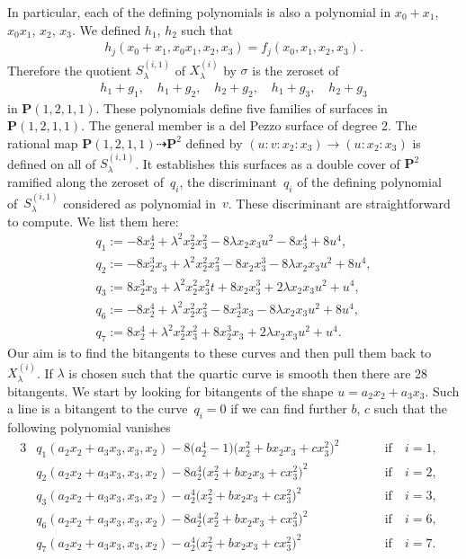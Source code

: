 \documentclass[pdftex]{sigma}
\numberwithin{equation}{section}
\begin{document}
In particular, each of the def\/ining polynomials is also a polynomial in $x_0+x_1$, $x_0x_1$, $x_2$, $x_3$. We def\/ined $h_1$, $h_2$ such that \begin{gather*}h_j(x_0+x_1,x_0x_1,x_2,x_3)=f_j(x_0,x_1,x_2,x_3).\end{gather*} Therefore the quotient $S^{(i,1)}_{\lambda}$ of $X^{(i)}_{\lambda}$ by $\sigma$ is the zeroset of
\begin{gather*} h_1+g_1,\quad h_1+g_2,\quad h_2+g_2, \quad h_1+g_3,\quad h_2+g_3\end{gather*}
in $\mathbf{P}(1,2,1,1)$. These polynomials def\/ine f\/ive families of surfaces in $\mathbf{P}(1,2,1,1)$. The general member is a del Pezzo surface of degree 2. The rational map $\mathbf{P}(1,2,1,1)\dashrightarrow \mathbf{P}^2$ def\/ined by $(u:v:x_2:x_3)\to (u:x_2:x_3)$ is def\/ined on all of $S^{(i,1)}_{\lambda}$. It establishes this surfaces as a double cover of $\mathbf{P}^2$ ramif\/ied along the zeroset of~$q_i$, the discriminant~$q_i$ of the def\/ining polynomial of~$S^{(i,1)}_{\lambda}$ considered as polynomial in~$v$. These discriminant are straightforward to compute. We list them here:
\begin{gather*}
q_1:=-8x_2^4+\lambda^2 x_2^2x_3^2-8\lambda x_2x_3u^2-8x_3^4+8u^4,\\
q_2:=-8x_2^3x_3+\lambda^2x_2^2x_3^2-8x_2x_3^3-8\lambda x_2x_3u^2+8u^4,\\
q_3:=8x_2^3x_3+\lambda^2x_2^2x_3^2t+8x_2x_3^3+2\lambda x_2x_3u^2+u^4,\\
q_6:=-8x_2^4+\lambda^2x_2^2x_3^2-8x_2^3x_3-8\lambda x_2x_3u^2+8u^4,\\
q_7:=8x_2^4+\lambda^2x_2^2x_3^2+8x_2^3x_3+2\lambda x_2x_3u^2+u^4.
\end{gather*}
Our aim is to f\/ind the bitangents to these curves and then pull them back to $X^{(i)}_{\lambda}$. If $\lambda$ is chosen such that the quartic curve is smooth then there are 28 bitangents. We start by looking for bitangents of the shape $u=a_2x_2+a_3 x_3$. Such a line is a bitangent to the curve~$q_i=0$ if we can f\/ind further $b$, $c$ such that the following polynomial vanishes
\begin{alignat*}{3}& q_1(a_2x_2+a_3x_3,x_3,x_2)-8\big(a_2^4-1\big) \big(x_2^2+bx_2x_3+cx_3^2\big)^2\qquad && \text{if} \quad i=1,&\\
&q_2(a_2x_2+a_3x_3,x_3,x_2)-8a_2^4 \big(x_2^2+bx_2x_3+cx_3^2\big)^2 \qquad &&\text{if} \quad i=2,&\\
&q_3(a_2x_2+a_3x_3,x_3,x_2)-a_2^4\big(x_2^2+bx_2x_3+cx_3^2\big)^2 \qquad &&\text{if} \quad i=3,&\\
&q_6(a_2x_2+a_3x_3,x_3,x_2)-8a_2^4\big(x_2^2+bx_2x_3+cx_3^2\big)^2 \qquad &&\text{if} \quad i=6,&\\
& q_7(a_2x_2+a_3x_3,x_3,x_2)-a_2^4 \big(x_2^2+bx_2x_3+cx_3^2\big)^2 \qquad &&\text{if}\quad i=7. & \end{alignat*}
\end{document}
